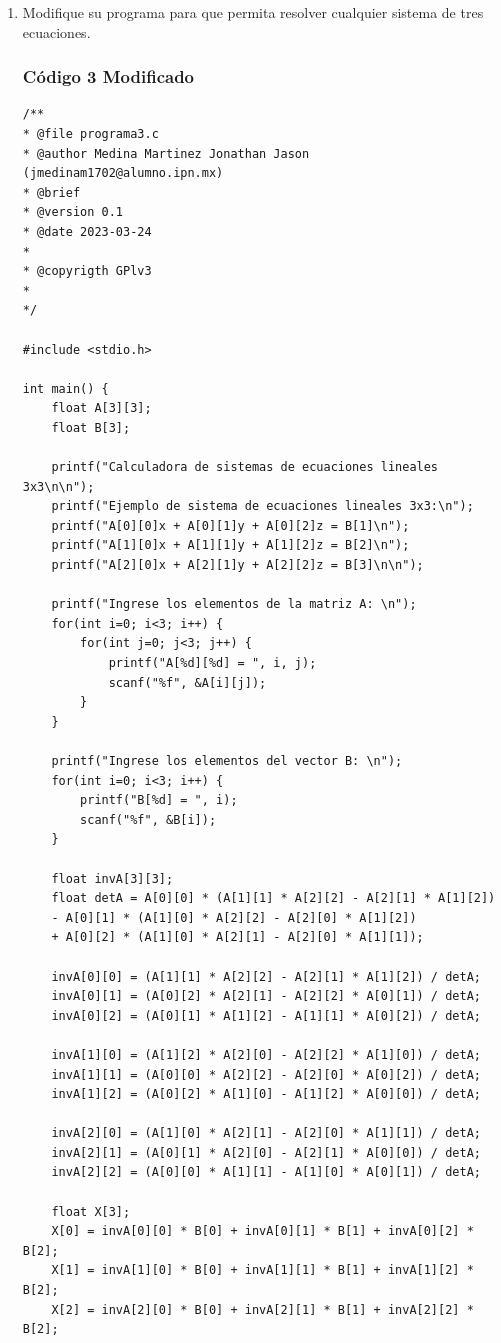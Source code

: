 \documentclass{article}
\begin{document}
\begin{enumerate}
\item Modifique su programa para que permita resolver cualquier sistema de tres ecuaciones.
\subsubsection{Código 3 Modificado}
\begin{lstlisting}
/**
* @file programa3.c
* @author Medina Martinez Jonathan Jason (jmedinam1702@alumno.ipn.mx)
* @brief 
* @version 0.1
* @date 2023-03-24
* 
* @copyrigth GPlv3
* 
*/

#include <stdio.h>

int main() {
	float A[3][3];
	float B[3];
	
	printf("Calculadora de sistemas de ecuaciones lineales 3x3\n\n");
	printf("Ejemplo de sistema de ecuaciones lineales 3x3:\n");
	printf("A[0][0]x + A[0][1]y + A[0][2]z = B[1]\n");
	printf("A[1][0]x + A[1][1]y + A[1][2]z = B[2]\n");
	printf("A[2][0]x + A[2][1]y + A[2][2]z = B[3]\n\n");
	
	printf("Ingrese los elementos de la matriz A: \n");
	for(int i=0; i<3; i++) {
		for(int j=0; j<3; j++) {
			printf("A[%d][%d] = ", i, j);
			scanf("%f", &A[i][j]);
		}
	}
	
	printf("Ingrese los elementos del vector B: \n");
	for(int i=0; i<3; i++) {
		printf("B[%d] = ", i);
		scanf("%f", &B[i]);
	}
	
	float invA[3][3];
	float detA = A[0][0] * (A[1][1] * A[2][2] - A[2][1] * A[1][2])
	- A[0][1] * (A[1][0] * A[2][2] - A[2][0] * A[1][2])
	+ A[0][2] * (A[1][0] * A[2][1] - A[2][0] * A[1][1]);
	
	invA[0][0] = (A[1][1] * A[2][2] - A[2][1] * A[1][2]) / detA;
	invA[0][1] = (A[0][2] * A[2][1] - A[2][2] * A[0][1]) / detA;
	invA[0][2] = (A[0][1] * A[1][2] - A[1][1] * A[0][2]) / detA;
	
	invA[1][0] = (A[1][2] * A[2][0] - A[2][2] * A[1][0]) / detA;
	invA[1][1] = (A[0][0] * A[2][2] - A[2][0] * A[0][2]) / detA;
	invA[1][2] = (A[0][2] * A[1][0] - A[1][2] * A[0][0]) / detA;
	
	invA[2][0] = (A[1][0] * A[2][1] - A[2][0] * A[1][1]) / detA;
	invA[2][1] = (A[0][1] * A[2][0] - A[2][1] * A[0][0]) / detA;
	invA[2][2] = (A[0][0] * A[1][1] - A[1][0] * A[0][1]) / detA;
	
	float X[3];
	X[0] = invA[0][0] * B[0] + invA[0][1] * B[1] + invA[0][2] * B[2];
	X[1] = invA[1][0] * B[0] + invA[1][1] * B[1] + invA[1][2] * B[2];
	X[2] = invA[2][0] * B[0] + invA[2][1] * B[1] + invA[2][2] * B[2];
	

\end{lstlisting}
\end{enumerate}
\end{document}

